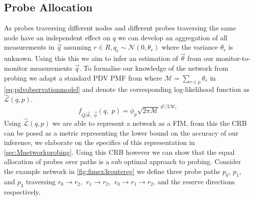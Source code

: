 \subsection{Probe Allocation}
\label{ssec:Mprobeallocation}
As probes traversing different nodes and different probes traversing the same node have an independent effect on $q$ we can develop an aggregation of all measurements in $\vec{q}$ assuming $r\in R, q_r \sim \mathcal{N}(0, \theta_r)$ where the variance $\theta_r$ is unknown. Using this this we aim to infer an estimation of $\vec{\theta}$ from our monitor-to-monitor measurements $\vec{q}$. To formalise our knowledge of the network from probing we adapt a standard PDV PMF from \cite{he_network_2021} where $\mathcal{M} = \sum_{r\in p}\theta_r$ in \cref{eq:pdvobservationmodel} and denote the corresponding log-likelihood function as $\widehat{\mathcal{L}}(q, p)$.
\begin{equation}
\label{eq:pdvobservationmodel}
    f_{Q|\vec{\theta},\; \vec{\phi}}(q,\;p) = \phi_p \sqrt{2\pi\mathcal{M}}^{\ q^2/{2\mathcal{M}_r}}
\end{equation}
Using $\widehat{\mathcal{L}}(q, p)$ we are able to represent a network as a FIM, from this the CRB can be posed as a metric representing the lower bound on the accuracy of our inference, we elaborate on the specifics of this representation in \cref{sec:Mnetworkprobing}. Using this CRB however we can show that the equal allocation of probes over paths is a sub optimal approach to probing. Consider the example network in \cref{fig:fimex3routereg} we define three probe paths $p_0$, $p_1$, and $p_3$ traversing $r_0\rightarrow r_2$, $\ r_1\rightarrow r_2$, $\ r_0\rightarrow r_1\rightarrow r_2$, and the reserve directions respectively.
